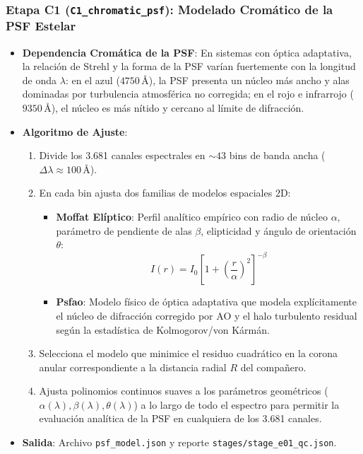 \documentclass[11pt,a4paper]{article}
\begin{document}
\subsubsection{Etapa C1 (\texttt{C1\_chromatic\_psf}): Modelado Cromático de la PSF Estelar}
\begin{itemize}[leftmargin=1.0cm]
    \item \textbf{Dependencia Cromática de la PSF}: En sistemas con óptica adaptativa, la relación de Strehl y la forma de la PSF varían fuertemente con la longitud de onda $\lambda$: en el azul ($4750\,\text{\AA}$), la PSF presenta un núcleo más ancho y alas dominadas por turbulencia atmosférica no corregida; en el rojo e infrarrojo ($9350\,\text{\AA}$), el núcleo es más nítido y cercano al límite de difracción.
    \item \textbf{Algoritmo de Ajuste}:
    \begin{enumerate}
        \item Divide los 3.681 canales espectrales en $\sim 43$ bins de banda ancha ($\Delta\lambda \approx 100\,\text{\AA}$).
        \item En cada bin ajusta dos familias de modelos espaciales 2D:
        \begin{itemize}
            \item \textbf{Moffat Elíptico}: Perfil analítico empírico con radio de núcleo $\alpha$, parámetro de pendiente de alas $\beta$, elipticidad y ángulo de orientación $\theta$:
            $$I(r) = I_0 \left[ 1 + \left(\frac{r}{\alpha}\right)^2 \right]^{-\beta}$$
            \item \textbf{Psfao}: Modelo físico de óptica adaptativa que modela explícitamente el núcleo de difracción corregido por AO y el halo turbulento residual según la estadística de Kolmogorov/von Kármán.
        \end{itemize}
        \item Selecciona el modelo que minimice el residuo cuadrático en la corona anular correspondiente a la distancia radial $R$ del compañero.
        \item Ajusta polinomios continuos suaves a los parámetros geométricos ($\alpha(\lambda), \beta(\lambda), \theta(\lambda)$) a lo largo de todo el espectro para permitir la evaluación analítica de la PSF en cualquiera de los 3.681 canales.
    \end{enumerate}
    \item \textbf{Salida}: Archivo \texttt{psf\_model.json} y reporte \texttt{stages/stage\_e01\_qc.json}.
\end{itemize}
\end{document}
